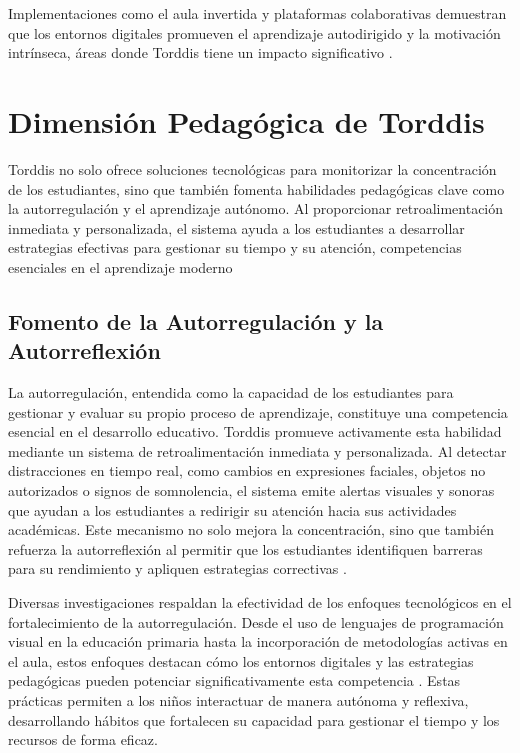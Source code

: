 \documentclass[a4paper,fleqn]{cas-sc}
\begin{document}
			Implementaciones como el aula invertida y plataformas colaborativas demuestran que los entornos digitales promueven el aprendizaje autodirigido y la motivación intrínseca, áreas donde Torddis tiene un impacto significativo \citep{Coffman2024Developing}.
		
	
	
	\section{Dimensión Pedagógica de Torddis}
	\label{seccion:Dos}	
		Torddis no solo ofrece soluciones tecnológicas para monitorizar la concentración de los estudiantes, sino que también fomenta habilidades pedagógicas clave como la autorregulación y el aprendizaje autónomo. Al proporcionar retroalimentación inmediata y personalizada, el sistema ayuda a los estudiantes a desarrollar estrategias efectivas para gestionar su tiempo y su atención, competencias esenciales en el aprendizaje moderno \cite{Loh2025Plugging}
		
		\subsection{Fomento de la Autorregulación y la Autorreflexión}
			La autorregulación, entendida como la capacidad de los estudiantes para gestionar y evaluar su propio proceso de aprendizaje, constituye una competencia esencial en el desarrollo educativo. Torddis promueve activamente esta habilidad mediante un sistema de retroalimentación inmediata y personalizada. Al detectar distracciones en tiempo real, como cambios en expresiones faciales, objetos no autorizados o signos de somnolencia, el sistema emite alertas visuales y sonoras que ayudan a los estudiantes a redirigir su atención hacia sus actividades académicas. Este mecanismo no solo mejora la concentración, sino que también refuerza la autorreflexión al permitir que los estudiantes identifiquen barreras para su rendimiento y apliquen estrategias correctivas \citep{Ackermans2025Young,Li2024Systematic}.
			
			Diversas investigaciones respaldan la efectividad de los enfoques tecnológicos en el fortalecimiento de la autorregulación. Desde el uso de lenguajes de programación visual en la educación primaria hasta la incorporación de metodologías activas en el aula, estos enfoques destacan cómo los entornos digitales y las estrategias pedagógicas pueden potenciar significativamente esta competencia \citep{SaezLopez2016Visual,Mohamed2018Implementing,Palioura2025Storylling}. Estas prácticas permiten a los niños interactuar de manera autónoma y reflexiva, desarrollando hábitos que fortalecen su capacidad para gestionar el tiempo y los recursos de forma eficaz.
			
\end{document}
